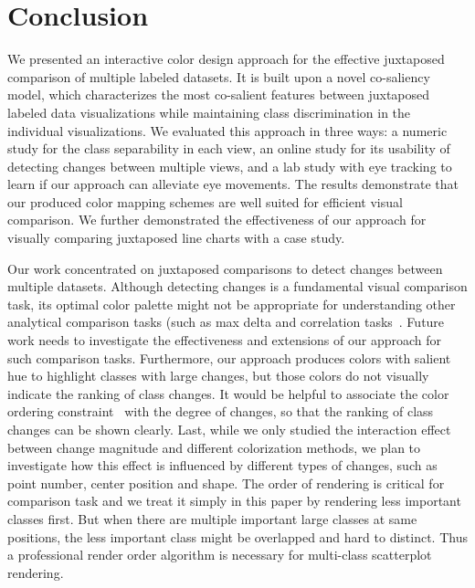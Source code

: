 \section {Conclusion}
We presented an interactive color design approach for the effective juxtaposed comparison of multiple labeled datasets.
It is built upon a novel co-saliency model, which characterizes the most co-salient features between juxtaposed labeled data visualizations while maintaining class discrimination in the individual visualizations.
We evaluated this approach in three ways: a numeric study for the class separability in each view,  an online study for its usability of detecting changes between multiple views, and a lab study with eye tracking to learn if our approach can alleviate eye movements. The results demonstrate that our produced color mapping schemes are well suited for efficient visual comparison. We further demonstrated the effectiveness of our approach for visually comparing juxtaposed line charts with a case study.


Our work concentrated on juxtaposed comparisons to detect changes between multiple datasets.
Although detecting changes is a fundamental visual comparison task, its optimal color palette might not be appropriate for understanding other analytical comparison tasks (such as max delta and correlation tasks~\cite{Ondov19}. Future work needs to investigate the effectiveness and extensions of our approach for such comparison tasks. Furthermore, our approach produces colors with salient hue to highlight classes with large changes, but those colors do not visually indicate the ranking of class changes.
It would be helpful to associate the color ordering constraint~\cite{Bujack18} with the degree of changes, so that the ranking of class changes can be shown clearly.
Last, while we only studied the interaction effect between change magnitude and different colorization methods, we plan to investigate how this effect is influenced by different types of changes, such as point number, center position and shape.
The order of rendering is critical for comparison task and we treat it simply in this paper by rendering less important classes first. But when there are multiple important large classes at same positions, the less important class might be overlapped and hard to distinct. Thus a professional render order algorithm is necessary for multi-class scatterplot rendering.